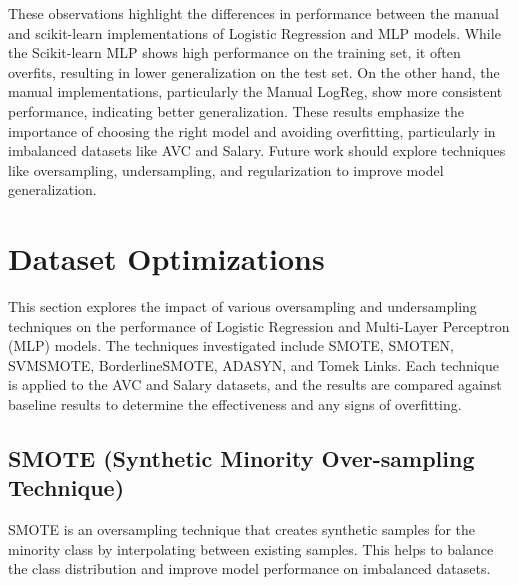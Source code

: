 \documentclass[a4paper,12pt]{article}
\begin{document}
These observations highlight the differences in performance between the manual and scikit-learn implementations of Logistic Regression and MLP models. While the Scikit-learn MLP shows high performance on the training set, it often overfits, resulting in lower generalization on the test set. On the other hand, the manual implementations, particularly the Manual LogReg, show more consistent performance, indicating better generalization. These results emphasize the importance of choosing the right model and avoiding overfitting, particularly in imbalanced datasets like AVC and Salary. Future work should explore techniques like oversampling, undersampling, and regularization to improve model generalization.

\section{Dataset Optimizations}

This section explores the impact of various oversampling and undersampling techniques on the performance of Logistic Regression and Multi-Layer Perceptron (MLP) models. The techniques investigated include SMOTE, SMOTEN, SVMSMOTE, BorderlineSMOTE, ADASYN, and Tomek Links. Each technique is applied to the AVC and Salary datasets, and the results are compared against baseline results to determine the effectiveness and any signs of overfitting.

\subsection{SMOTE (Synthetic Minority Over-sampling Technique)}

SMOTE is an oversampling technique that creates synthetic samples for the minority class by interpolating between existing samples. This helps to balance the class distribution and improve model performance on imbalanced datasets.
\end{document}
